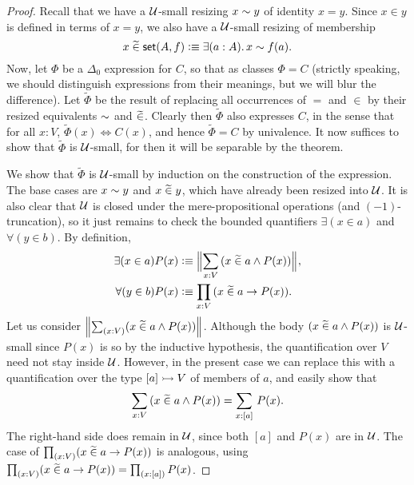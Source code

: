 \begin{proof}
Recall that we have a $\mathcal{U}$-small resizing $x \sim y$ of identity $x = y$. Since $x\in y$ is defined in terms of $x=y$, we also have a $\mathcal{U}$-small resizing of membership
%
\begin{equation*}
  x\bin\vset(A,f) \defeq \exis{a:A} x \bisim f(a).
\end{equation*}
%
Now, let $\Phi$ be a $\Delta_0$ expression for $C$, so that as classes $\Phi = C$ (strictly speaking, we should distinguish expressions from their meanings, but we will blur the difference). Let $\widetilde{\Phi}$ be the result of replacing all occurrences of $=$ and $\in$ by their resized equivalents $\sim$ and $\mathrel{\widetilde{\in}}$.  Clearly then $\widetilde{\Phi}$ also expresses $C$, in the sense that for all $x:V$, $\widetilde{\Phi}(x) \Leftrightarrow C(x)$, and hence $\widetilde{\Phi}=C$ by univalence.  It now suffices to show that $\widetilde{\Phi}$ is $\mathcal{U}$-small, for then it will be separable by the theorem.

We show that  $\widetilde{\Phi}$ is $\mathcal{U}$-small by induction on the construction of the expression.  The base cases are $x \sim y$ and $x\mathrel{\widetilde{\in}} y$, which have already been resized into $\mathcal{U}$.  It is also clear that $\mathcal{U}$ is closed under the mere-propositional operations (and $(-1)$-truncation), so it just remains to check the bounded quantifiers $\exists(x\in a)$ and $\forall(y\in b)$.  By definition,
\begin{align*}
\exists(x\in a) P(x) &\defeq \Brck {\sm{x:V}(x\bin a \land P(x))},\\
\forall(y\in b) P(x) &\defeq  \prd{x:V}(x\bin a \to P(x)).
\end{align*}
Let us consider $\brck {\sm{x:V}(x\bin a \land P(x))}$.  Although the body $(x\mathrel{\widetilde{\in}} a \land P(x))$ is $\mathcal{U}$-small since $P(x)$ is so by the inductive hypothesis, the quantification over $V$ need not stay inside $\mathcal{U}$.  However, in the present case we can replace this with a quantification over the type $[a]\rightarrowtail V$ of members of $a$, and easily show that
\begin{equation*}
  \sm{x:V}(x\bin a \land P(x)) = \sm{x:[a]} P(x).
\end{equation*}
The right-hand side does remain in $\mathcal{U}$, since both $[a]$ and $P(x)$ are in $\mathcal{U}$.  The case of $\prd{x:V}(x\bin a \to P(x))$ is analogous, using $\prd{x:V}(x\bin a \to P(x)) = \prd{x:[a]}P(x)$.
\end{proof}


